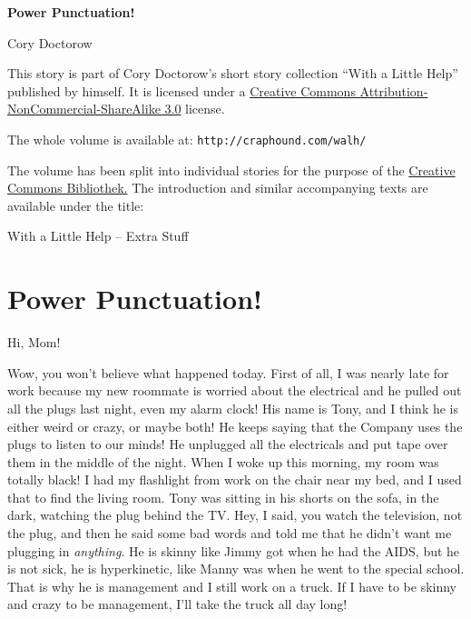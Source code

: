 



\raggedbottom

\begin{center}
\textbf{\huge\textsf{Power Punctuation!}}

\medskip
Cory Doctorow

\end{center}

\bigskip

\begin{flushleft}
This story is part of Cory Doctorow’s short story collection
“With a Little Help” published by himself. It is licensed under a
\href{http://creativecommons.org/licenses/by-nc-sa/}
{Creative Commons Attribution-NonCommercial-ShareAlike 3.0} license.

\bigskip

The whole volume is available at:
\texttt{http://craphound.com/walh/}

\medskip

The volume has been split into individual stories for the purpose of the
\href{http://ccbib.org}{Creative Commons Bibliothek.}
The introduction and similar accompanying texts are available under the 
title:
\end{flushleft}
\begin{center}
With a Little Help -- Extra Stuff
\end{center}

\newpage

\section{Power Punctuation!}

Hi, Mom!

Wow, you won't believe what happened today. First of all, I was nearly 
late for work because my new roommate is worried about the electrical 
and he pulled out all the plugs last night, even my alarm clock! His 
name is Tony, and I think he is either weird or crazy, or maybe both! 
He keeps saying that the Company uses the plugs to listen to our minds! 
He unplugged all the electricals and put tape over them in the middle 
of the night. When I woke up this morning, my room was totally black! I 
had my flashlight from work on the chair near my bed, and I used that 
to find the living room. Tony was sitting in his shorts on the sofa, in 
the dark, watching the plug behind the TV. Hey, I said, you watch the 
television, not the plug, and then he said some bad words and told me 
that he didn't want me plugging in \emph{anything}. He is skinny like 
Jimmy got when he had the AIDS, but he is not sick, he is hyperkinetic, 
like Manny was when he went to the special school. That is why he is 
management and I still work on a truck. If I have to be skinny and 
crazy to be management, I'll take the truck all day long!

